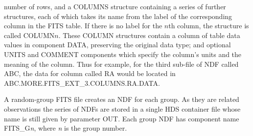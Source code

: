 \documentclass[twoside,11pt]{article}
\newcommand{\sstitem}{\item}
\newcommand{\sstitem}{\item}
\begin{document}
{{{         number of rows, and a COLUMNS structure containing a series of
         further structures, each of which takes its name from the label
         of the corresponding column in the FITS table.  If there is no
         label for the $n$th column, the structure is called COLUMN$n$.
         These COLUMN structures contain a column of table data values in
         component DATA, preserving the original data type; and optional
         UNITS and COMMENT components which specify the column's units and
         the meaning of the column.  Thus for example, for the third
         sub-file of NDF called ABC, the data for column called RA would be
         located in ABC.MORE.FITS\_EXT\_3.COLUMNS.RA.DATA.
         \sstitem
         A random-group FITS file creates an NDF for each group.  As
         they are related observations the series of NDFs are stored in a
         single HDS container file whose name is still given by parameter
         OUT.  Each group NDF has component name FITS\_G\textit{n}, where 
         \textit{n} is the group number.

}}}
\end{document}
